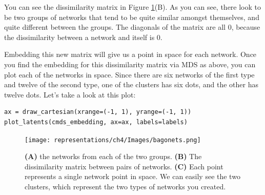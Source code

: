 You can see the dissimilarity matrix in Figure \ref{fig:ch4:bagonets}(B). As you can see, there look to be two groups of networks that tend to be quite similar amongst themselves, and quite different between the groups. The diagonals of the matrix are all 0, because the dissimilarity between a network and itself is 0.

Embedding this {new} matrix will give us a point in space for each network. Once you find the embedding for this dissimilarity matrix via MDS as above, you can plot each of the networks in space. Since there are six networks of the first type and twelve of the second type, one of the clusters has six dots, and the other has twelve dots. Let's take a look at this plot:
\begin{lstlisting}[style=python]
ax = draw_cartesian(xrange=(-1, 1), yrange=(-1, 1))
plot_latents(cmds_embedding, ax=ax, labels=labels)
\end{lstlisting}

\begin{figure}
    \centering
    \texttt{[image: representations/ch4/Images/bagonets.png]}
    \caption[Bags of networks]{\textbf{(A)} the networks from each of the two groups. \textbf{(B)} The dissimilarity matrix between pairs of networks. \textbf{(C)} Each point represents a single network point in space. We can easily see the two clusters, which represent the two types of networks you created.}
    \label{fig:ch4:bagonets}
\end{figure}

\newpage